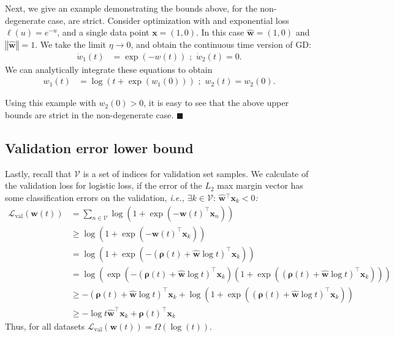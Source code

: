\documentclass[twoside,11pt,english]{article}
\begin{document}
Next, we give an example demonstrating the bounds above, for the non-degenerate case, are strict.
Consider optimization with and exponential loss $\ell\left(u\right)=e^{-u}$,
and a single data point $\mathbf{x}=\left(1,0\right)$. In this case
$\hat{\mathbf{w}}=\left(1,0\right)$ and $\left\Vert \hat{\mathbf{w}}\right\Vert =1$.
We take the limit $\eta\rightarrow0$, and obtain the continuous time
version of GD: 
\begin{align*}
\dot{w}_{1}\left(t\right) & =\exp\left(-w\left(t\right)\right)\,\,;\,\,\dot{w}_{2}\left(t\right)=0.
\end{align*}
We can analytically integrate these equations to obtain 
\begin{align*}
w_{1}\left(t\right) & =\log\left(t+\exp\left(w_{1}\left(0\right)\right)\right)\,\,;\,\,w_{2}\left(t\right)=w_{2}\left(0\right).
\end{align*}

Using this example with $w_{2}\left(0\right)>0$, it is easy to see that the above upper bounds are strict in the non-degenerate case. $\blacksquare$

\subsection{Validation error lower bound}
Lastly, recall that $\mathcal{V}$ is a set of indices for validation
set samples. We calculate of the validation loss for logistic loss,
if the error of the $L_{2}$ max margin vector has some classification
errors on the validation, \emph{i.e., $\exists k\in\mathcal{V}:\,\hat{\mathbf{w}}{}^{\top}\mathbf{x}_{k}<0$:}
\begin{align*}
\mathcal{L}_{\mathrm{val}}\left(\mathbf{w}\left(t\right)\right) & =\sum_{n\in\mathcal{V}}\log\left(1+\exp\left(-\mathbf{w}\left(t\right)^{\top}\mathbf{x}_{n}\right)\right)\\
 & \geq\log\left(1+\exp\left(-\mathbf{w}\left(t\right)^{\top}\mathbf{x}_{k}\right)\right)\\
 & =\log\left(1+\exp\left(-\left(\boldsymbol{\rho}\left(t\right)+\hat{\mathbf{w}}\log t\right)^{\top}\mathbf{x}_{k}\right)\right)\\
 & =\log\left(\exp\left(-\left(\boldsymbol{\rho}\left(t\right)+\hat{\mathbf{w}}\log t\right)^{\top}\mathbf{x}_{k}\right)\left(1+\exp\left(\left(\boldsymbol{\rho}\left(t\right)+\hat{\mathbf{w}}\log t\right)^{\top}\mathbf{x}_{k}\right)\right)\right)\\
 & \geq-\left(\boldsymbol{\rho}\left(t\right)+\hat{\mathbf{w}}\log t\right)^{\top}\mathbf{x}_{k}+\log\left(1+\exp\left(\left(\boldsymbol{\rho}\left(t\right)+\hat{\mathbf{w}}\log t\right)^{\top}\mathbf{x}_{k}\right)\right)\\
 & \geq-\log t\hat{\mathbf{w}}^{\top}\mathbf{x}_{k}+\boldsymbol{\rho}\left(t\right)^{\top}\mathbf{x}_{k}
\end{align*}
Thus, for all datasets $\mathcal{L}_{\mathrm{val}}\left(\mathbf{w}\left(t\right)\right)=\Omega(\log (t))$.
\end{document}

